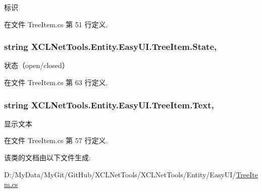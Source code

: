 标识 



在文件 Tree\-Item.\-cs 第 51 行定义.

\hypertarget{class_x_c_l_net_tools_1_1_entity_1_1_easy_u_i_1_1_tree_item_a79ad03a5903f54fdd4d60a3206105def}{
\subsubsection[{State}]{\setlength{\rightskip}{0pt plus 5cm}string X\-C\-L\-Net\-Tools.\-Entity.\-Easy\-U\-I.\-Tree\-Item.\-State\hspace{0.3cm}{\ttfamily [get]}, {\ttfamily [set]}}}\label{class_x_c_l_net_tools_1_1_entity_1_1_easy_u_i_1_1_tree_item_a79ad03a5903f54fdd4d60a3206105def}


状态（open/closed） 



在文件 Tree\-Item.\-cs 第 63 行定义.

\hypertarget{class_x_c_l_net_tools_1_1_entity_1_1_easy_u_i_1_1_tree_item_ad85e722c4909d6b93ea2e80e7014ed0c}{
\subsubsection[{Text}]{\setlength{\rightskip}{0pt plus 5cm}string X\-C\-L\-Net\-Tools.\-Entity.\-Easy\-U\-I.\-Tree\-Item.\-Text\hspace{0.3cm}{\ttfamily [get]}, {\ttfamily [set]}}}\label{class_x_c_l_net_tools_1_1_entity_1_1_easy_u_i_1_1_tree_item_ad85e722c4909d6b93ea2e80e7014ed0c}


显示文本 



在文件 Tree\-Item.\-cs 第 57 行定义.



该类的文档由以下文件生成\-:\begin{DoxyCompactItemize}
\item 
D\-:/\-My\-Data/\-My\-Git/\-Git\-Hub/\-X\-C\-L\-Net\-Tools/\-X\-C\-L\-Net\-Tools/\-Entity/\-Easy\-U\-I/\hyperlink{_tree_item_8cs}{Tree\-Item.\-cs}\end{DoxyCompactItemize}

